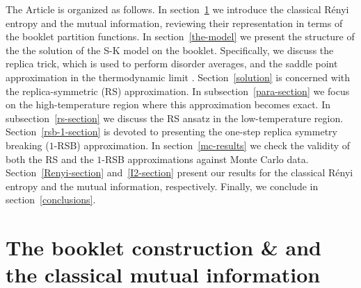 \documentclass[twocolumn,superscriptaddress,prb,10pt]{revtex4-1}
\begin{document}
The Article is organized as follows. In section~\ref{booklet} we introduce the classical 
R\'enyi entropy and the mutual information, reviewing their representation in terms of 
the booklet partition functions. In section~\ref{the-model} we present the structure of 
the  the solution of the S-K model on the booklet. Specifically, we discuss the replica 
trick, which is used to perform disorder averages, and the saddle point approximation in 
the thermodynamic limit . Section~\ref{solution} is concerned with the replica-symmetric 
(RS) approximation. In subsection~\ref{para-section} we focus on the high-temperature 
region where this approximation becomes exact. In subsection~\ref{rs-section} we discuss 
the RS ansatz in the low-temperature region. Section~\ref{rsb-1-section} is devoted to   
presenting the one-step replica symmetry breaking ($1$-RSB) approximation. In 
section~\ref{mc-results} we check the validity of both the RS and the $1$-RSB approximations 
against Monte Carlo data. Section~\ref{Renyi-section} and~\ref{I2-section} present our results 
for the classical R\'enyi entropy and the mutual information, respectively. Finally, 
we conclude in section~\ref{conclusions}.



\section{The booklet construction \& and the classical mutual information}
\label{booklet}
\end{document}
